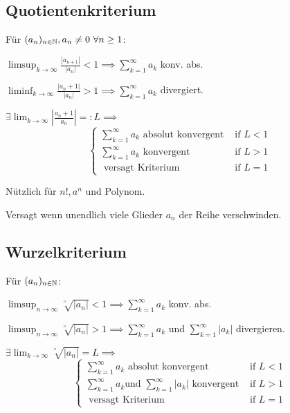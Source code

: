 \subsection{Quotientenkriterium}
Für $(a_n)_{n \in \mathbb{N}}, a_n \neq 0 \ \forall n \ge 1$:
\begin{compactenum}
    \item $\limsup_{k \to \infty} \frac{\left| a_{n+1} \right|}{\left| a_n \right| } < 1 \implies \sum_{k=1}^{\infty} a_k$ konv. abs.
    \item $\liminf_{k \to \infty} \frac{\left| a_n + 1 \right|}{\left| a_n \right| } > 1 \implies \sum_{k=1}^{\infty} a_k$ divergiert.
\end{compactenum}
\begin{compactitem}
    \item $\exists \lim_{k \to \infty} \left| \frac{a_n + 1}{a_n} \right| =:  L \implies$
        \[
        \begin{cases}
            \sum_{k=1}^{\infty} a_k \text{ absolut konvergent} & \text{ if } L < 1\\
            \sum_{k=1}^{\infty} a_k \text{ konvergent} & \text{ if } L > 1\\
            \text{ versagt Kriterium} & \text{ if } L = 1
        \end{cases}
        \]
    \item Nützlich für $n!, a^n$ und Polynom.
    \item Versagt wenn unendlich viele Glieder $a_n$ der Reihe verschwinden.
\end{compactitem}

\subsection{Wurzelkriterium}
Für $(a_n)_{n \in \mathbb{N}}$:
\begin{compactenum}
    \item $\limsup_{n \to \infty} \sqrt[^n]{\left| a_n \right| } < 1 \implies \sum_{k=1}^{\infty} a_k$ konv. abs.
    \item $\limsup_{n \to \infty} \sqrt[^n]{\left| a_n \right| } > 1 \implies \sum_{k=1}^{\infty} a_k$ und $\sum_{k=1}^{\infty} |a_k|$ divergieren.
\end{compactenum}
\begin{compactitem}
    \item $\exists \lim_{k \to \infty} \sqrt[^n]{ \left| a_n \right| }  = L \implies$
        \[
        \begin{cases}
            \sum_{k=1}^{\infty} a_k \text{ absolut konvergent} & \text{ if } L < 1\\
            \sum_{k=1}^{\infty} a_k \text{und }\sum_{k=1}^{\infty} |a_k| \text{ konvergent} & \text{ if } L > 1\\
            \text{ versagt Kriterium} & \text{ if } L = 1
        \end{cases}
        \]
\end{compactitem}

